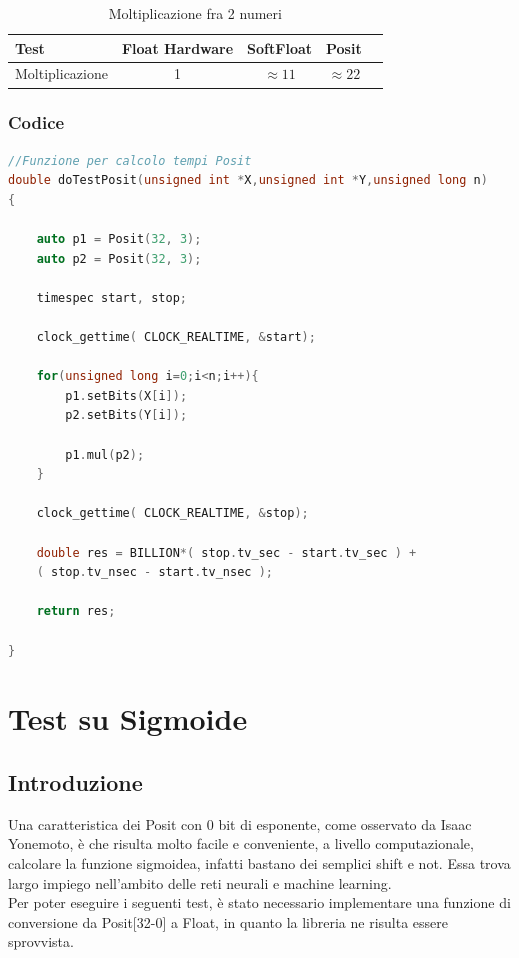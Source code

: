 \documentclass[a4paper,11pt]{article}
\begin{document}
\begin{table}[ht]
	\centering
	\begin{tabular}{l*{3}{c}r}
		Test              &Float Hardware & SoftFloat & Posit  \\
		\hline
		Moltiplicazione		& 1 & $\approx11$ & $\approx22$   		\\
		\hline
	\end{tabular}
	\caption{Moltiplicazione fra 2 numeri}
\end{table}


\newpage
\subsubsection{Codice}
\begin{lstlisting}[language=C++]
//Funzione per calcolo tempi Posit
double doTestPosit(unsigned int *X,unsigned int *Y,unsigned long n)
{

	auto p1 = Posit(32, 3);
	auto p2 = Posit(32, 3);    
	
	timespec start, stop;
	
	clock_gettime( CLOCK_REALTIME, &start);
	
	for(unsigned long i=0;i<n;i++){
		p1.setBits(X[i]);
		p2.setBits(Y[i]);
	
		p1.mul(p2);
	}
	
	clock_gettime( CLOCK_REALTIME, &stop);
	
	double res = BILLION*( stop.tv_sec - start.tv_sec ) + 
	( stop.tv_nsec - start.tv_nsec );
	
	return res;

}


\end{lstlisting}
\newpage
\section{Test su Sigmoide}
\subsection{Introduzione}
Una caratteristica dei Posit con 0 bit di esponente, come osservato da Isaac Yonemoto, è che risulta molto facile e conveniente, a livello computazionale, calcolare la funzione sigmoidea, infatti bastano dei semplici shift e not. Essa trova largo impiego nell'ambito delle reti neurali e machine learning.
\\Per poter eseguire i seguenti test, è stato necessario implementare una funzione di conversione da Posit[32-0] a Float, in quanto la libreria ne risulta essere sprovvista.
\end{document}
